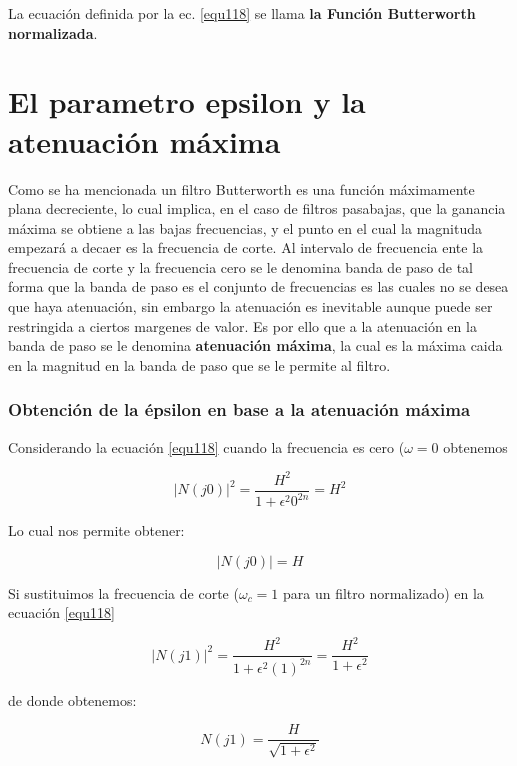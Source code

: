 \documentclass[12pt]{book}
\theoremstyle{definition}
\theoremstyle{remark}
\theoremstyle{plain}
\begin{document}
La ecuación definida por la ec. \ref{equ118} se llama \textbf{la Función Butterworth normalizada}.

\section{El parametro epsilon y la atenuación máxima}
Como se ha mencionada un filtro Butterworth es una función máximamente plana decreciente, lo cual implica, en el caso de filtros pasabajas, que la ganancia máxima se obtiene a las bajas frecuencias, y el punto en el cual la magnituda empezará a decaer es la frecuencia de corte. Al intervalo de frecuencia ente la frecuencia de corte y la frecuencia cero se le denomina banda de paso de tal forma que la banda de paso es el conjunto de frecuencias es las cuales no se desea que haya atenuación, sin embargo la atenuación es inevitable aunque  puede ser restringida a ciertos margenes de valor. Es por ello que a la atenuación en la banda de paso se le denomina \textbf{atenuación máxima}, la cual es la máxima caida en la magnitud en la banda de paso que se le permite al filtro.

\subsubsection{Obtención de la épsilon en base a la atenuación máxima}

Considerando la ecuación \ref{equ118} cuando la frecuencia es cero ($\omega=0$ obtenemos

\begin{equation}
|N(j0)|^ 2 = \frac{H^2}{1+\epsilon ^2 0 ^ {2 n}}= H^2
\label{equ120}
\end{equation}

Lo cual nos permite obtener:

\begin{equation*}
|N(j0)|= H
\end{equation*}

Si sustituimos la frecuencia de corte ($\omega _c =1$ para un filtro normalizado) en la ecuación \ref{equ118}

\begin{equation*}
|N(j1)|^2=\frac{H^2}{1+ \epsilon ^2 (1) ^{2n}}= \frac{H^2}{1+\epsilon^2}
\end{equation*}

de donde obtenemos:

\begin{equation}
N(j1)= \frac{H}{\sqrt{1+\epsilon ^2}}
\label{equ119}
\end{equation}
\end{document}
